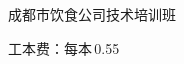 \documentclass{cookbook}
\begin{document}
\vspace*{\fill}

\begin{flushright}
\footnotesize%
\doublespacing
{%
	\hefamily%
	成都市饮食公司技术培训班
}

工本费：每本\,0.55%
	\mbox{\hspace{1.8em}}
\end{flushright}
\end{document}
